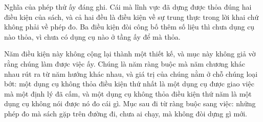 Nghĩa của phép thử ấy đáng ghi. Cái mà lĩnh vực đã dựng được thỏa đúng hai điều
kiện của sách, và cả hai đều là điều kiện về sự trung thực trong lời khai chứ
không phải về phép đo. Ba điều kiện đòi công bố thêm số liệu thì chưa dụng cụ nào
thỏa, vì chưa có dụng cụ nào ở tầng ấy để mà thỏa.

%
Năm điều kiện này không cộng lại thành một thiết kế, và mục này không giả vờ rằng
chúng làm được việc ấy. Chúng là năm ràng buộc mà năm chương khác nhau rút ra từ
năm hướng khác nhau, và giá trị của chúng nằm ở chỗ chúng loại bớt: một dụng cụ
không thỏa điều kiện thứ nhất là một dụng cụ được giao việc mà một định lý đã cấm,
và một dụng cụ không thỏa điều kiện thứ năm là một dụng cụ không nói được nó đo
cái gì. Mục sau đi từ ràng buộc sang việc: những phép đo mà sách gặp trên đường
đi, chưa ai chạy, mà không đòi dựng gì mới.
